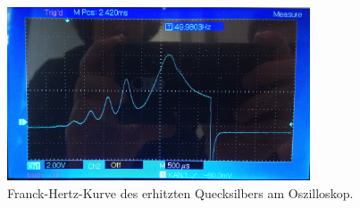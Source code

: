 \begin{figure}[ht]
	\centering
	\includegraphics[width=0.8\textwidth]{bilder/hgg.jpg}
	\caption{Franck-Hertz-Kurve des erhitzten Quecksilbers am Oszilloskop.}
	\label{fig:kurveHgg}	
\end{figure}